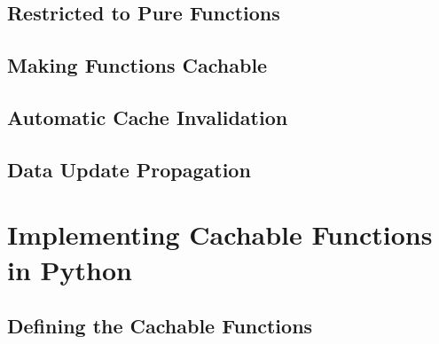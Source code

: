 

\subsection{Restricted to Pure Functions}
\label{subsec:restricted_to_pure_functions}



\subsection{Making Functions Cachable}
\label{subsec:making_functions_cachable}



\subsection{Automatic Cache Invalidation}
\label{subsec:automatic_cache_invalidation}


\subsection{Data Update Propagation}
\label{subsec:model_data_update_propagation}


\section{Implementing Cachable Functions in Python}
\label{sec:implementing_cachable_functions_in_python}

\subsection{Defining the Cachable Functions}
\label{subsec:defining_the_cachable_functions}





